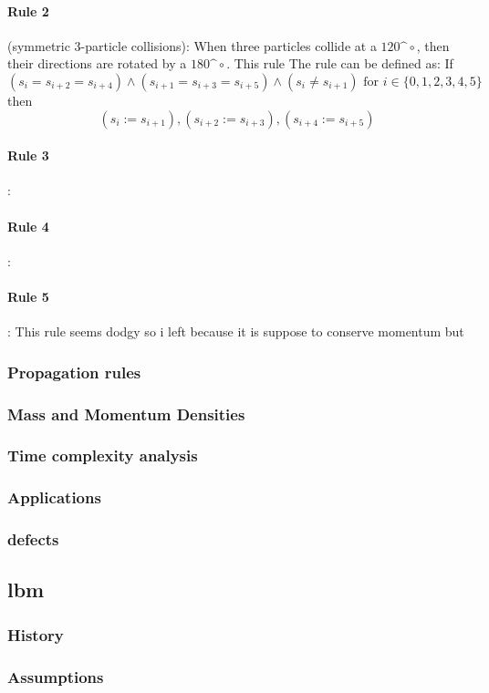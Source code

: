 \documentclass[a4paper,10pt]{article}
\begin{document}
\paragraph{Rule 2}(symmetric 3-particle collisions):
When three particles collide at a $120\^{\circ}$, then their directions are rotated by a $180\^{\circ}$. This rule  The rule can be defined as: If \[(s_{i} = s_{i + 2} = s_{i + 4})\wedge(s_{i + 1} = s_{i + 3} = s_{i + 5})\wedge(s_{i} \neq s_{i + 1})\mbox{ for } i \in \{0, 1, 2, 3, 4, 5\}\] then \[ (s_{i} := s_{i + 1}), (s_{i + 2} := s_{i + 3}), (s_{i + 4} := s_{i + 5})\]
\paragraph{Rule 3}:
\paragraph{Rule 4}:
\paragraph{Rule 5}:
This rule seems dodgy so i left because it is suppose to conserve momentum but 
\subsubsection{Propagation rules}
\subsubsection{Mass and Momentum Densities}
\subsubsection{Time complexity analysis}
\subsubsection{Applications}
\subsubsection{defects}
\subsection{\Acrfull{lbm}}
\subsubsection{History}
\subsubsection{Assumptions}
\end{document}
